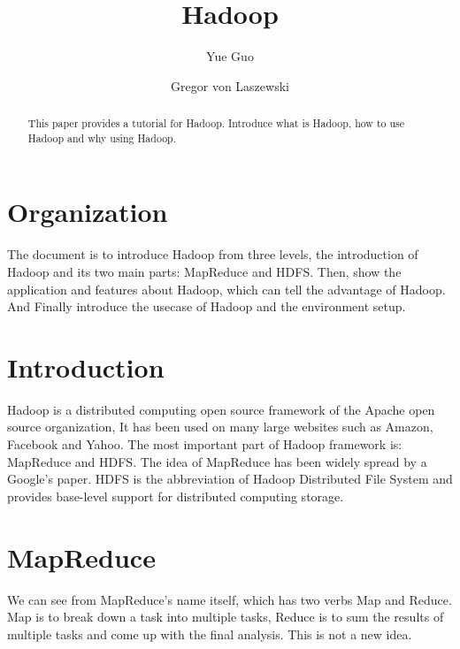\title{Hadoop}



\author{Yue Guo}


\author{Gregor von Laszewski}



\begin{abstract}
This paper provides a tutorial for Hadoop. Introduce what is Hadoop, how to use Hadoop and why using Hadoop.
\end{abstract}



\maketitle

\section{Organization}
The document is to introduce Hadoop from three levels, the introduction of Hadoop and its  two main parts: MapReduce and HDFS. Then, show the application and features about Hadoop, which can tell the advantage of Hadoop. And Finally introduce the usecase of Hadoop and the environment setup.

\section{Introduction}
Hadoop is a distributed computing open source framework of the Apache open source organization, It has been used on many large websites such as Amazon, Facebook and Yahoo. The most important part of Hadoop framework is: MapReduce and HDFS. The idea of MapReduce has been widely spread by a Google's paper. HDFS is the abbreviation of Hadoop Distributed File System and provides base-level support for distributed computing storage.


\section{MapReduce}
We can see from MapReduce's name itself, which has two verbs Map and Reduce. Map is to break down a task into multiple tasks, Reduce is to sum the results of multiple tasks and come up with the final analysis. This is not a new idea. 

